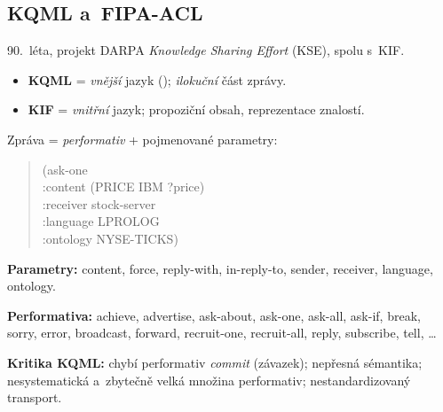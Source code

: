 \documentclass[11pt,a4paper]{article}
\theoremstyle{definition}
\begin{document}
\subsection{KQML a~FIPA-ACL}

\begin{defbox}
90.~léta, projekt DARPA \emph{Knowledge Sharing Effort} (KSE), spolu s~KIF.
\begin{itemize}
\item \textbf{KQML} = \emph{vnější} jazyk (); \emph{ilokuční} část zprávy.
\item \textbf{KIF} = \emph{vnitřní} jazyk; propoziční obsah, reprezentace znalostí.
\end{itemize}
Zpráva = \emph{performativ} + pojmenované parametry:
\begin{quote}\small\ttfamily
(ask-one\\
\hspace*{1em}:content (PRICE IBM ?price)\\
\hspace*{1em}:receiver stock-server\\
\hspace*{1em}:language LPROLOG\\
\hspace*{1em}:ontology NYSE-TICKS)
\end{quote}
\textbf{Parametry:} content, force, reply-with, in-reply-to, sender, receiver, language, ontology.

\textbf{Performativa:} achieve, advertise, ask-about, ask-one, ask-all, ask-if,
break, sorry, error, broadcast, forward, recruit-one, recruit-all, reply, subscribe, tell, \dots
\end{defbox}

\textbf{Kritika KQML:} chybí performativ \emph{commit} (závazek); nepřesná sémantika;
nesystematická a~zbytečně velká množina performativ; nestandardizovaný transport.
\end{document}
